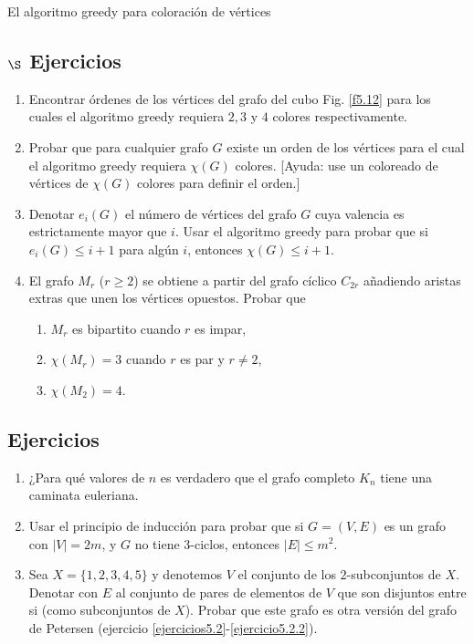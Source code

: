 \begin{section}{El algoritmo greedy para coloración de vértices}
\subsection*{$\S$ Ejercicios}\label{ejercicio5.7} 
\begin{enumerate}
\item Encontrar órdenes de los vértices del grafo del cubo Fig. \ref{f5.12}  para los cuales el algoritmo greedy requiera $2, 3$ y $4$ colores respectivamente.
\item \label{ejercicio5.7.2} Probar que para cualquier grafo $G$ existe un orden de los vértices para el cual el algoritmo greedy requiera $\chi(G)$ colores. [Ayuda: use un coloreado de vértices de $\chi(G)$ colores para definir el orden.]
\item Denotar $e_i(G)$ el número de vértices del grafo $G$ cuya valencia es estrictamente mayor que $i$. Usar el algoritmo greedy para probar que si $e_i(G) \le i+1$ para algún $i$, entonces $\chi(G) \le
i+1$.
\item El grafo $M_r$ ($r\ge 2$) se obtiene a partir del grafo cíclico $C_{2r}$ añadiendo aristas extras que unen los vértices opuestos. Probar que 
\begin{enumerate}
    \item $M_r$ es bipartito cuando $r$ es impar,
    
    \item $\chi(M_r)=3$ cuando $r$ es par y $r\not= 2$,
    
    \item $\chi(M_2)=4$.
\end{enumerate}
\end{enumerate}

\section{Ejercicios}
\begin{enumerate}
\item ¿Para qué valores de $n$ es verdadero que el grafo completo $K_n$ tiene una caminata euleriana.

\item Usar el principio de inducción para probar que si $G=(V,E)$ es un grafo con $|V|=2m$, y $G$ no tiene $3$-ciclos, entonces $|E|\le m^2$.

\item Sea $X=\{1,2,3,4,5\}$ y denotemos $V$ el conjunto de los $2$-subconjuntos de $X$. Denotar con $E$ al conjunto de pares de elementos de $V$ que son disjuntos entre si (como subconjuntos de $X$). Probar que este grafo es otra versión del grafo de Petersen (ejercicio \ref{ejercicios5.2}-\ref{ejercicio5.2.2}).


\end{enumerate}
\end{section}
